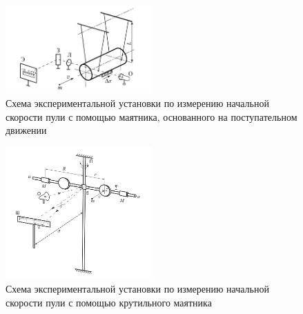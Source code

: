 \documentclass[12pt]{article}
\begin{document}
\begin{figure}
    \begin{center}
        \includegraphics[width=0.5\textwidth]{im1.png}
    \end{center}
    \caption{Схема экспериментальной установки по измерению начальной скорости пули с помощью маятника, основанного на поступательном движении}
    \label{fig:1}
\end{figure}
\begin{figure}
    \begin{center}
        \includegraphics[width=0.5\textwidth]{im2.png}
    \end{center}
    \caption{Схема экспериментальной установки по измерению начальной скорости пули с помощью крутильного маятника}
    \label{fig:2}
\end{figure}
\end{document}
